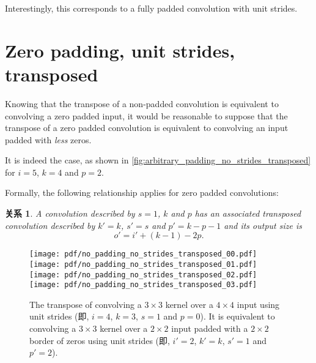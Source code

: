 \documentclass[notitlepage]{ctexrep}
\newtheorem{relationship}{关系}
\begin{document}
Interestingly, this corresponds to a fully padded convolution with unit
strides.

\section{Zero padding, unit strides, transposed}

Knowing that the transpose of a non-padded convolution is equivalent to
convolving a zero padded input, it would be reasonable to suppose that the
transpose of a zero padded convolution is equivalent to convolving an input
padded with {\em less\/} zeros.

It is indeed the case, as shown in
\autoref{fig:arbitrary_padding_no_strides_transposed} for $i = 5$, $k = 4$ and
$p = 2$.

Formally, the following relationship applies for zero padded convolutions:

\begin{relationship}\label{rel:arbitrary_padding_no_strides_transposed}
A convolution described by $s = 1$, $k$ and $p$ has an
associated transposed convolution described by $k' = k$, $s' = s$ and $p' = k -
p - 1$ and its output size is
\begin{equation*}
    o' = i' + (k - 1) - 2p.
\end{equation*}
\end{relationship}

\begin{figure}[p]
    \centering
    \texttt{[image: pdf/no\_padding\_no\_strides\_transposed\_00.pdf]}
    \texttt{[image: pdf/no\_padding\_no\_strides\_transposed\_01.pdf]}
    \texttt{[image: pdf/no\_padding\_no\_strides\_transposed\_02.pdf]}
    \texttt{[image: pdf/no\_padding\_no\_strides\_transposed\_03.pdf]}
    \caption{\label{fig:no_padding_no_strides_transposed} The transpose of
        convolving a $3 \times 3$ kernel over a $4 \times 4$ input using unit
        strides (即, $i = 4$, $k = 3$, $s = 1$ and $p = 0$). It is equivalent
        to convolving a $3 \times 3$ kernel over a $2 \times 2$ input padded
        with a $2 \times 2$ border of zeros using unit strides (即, $i' = 2$,
        $k' = k$, $s' = 1$ and $p' = 2$).}
\end{figure}
\end{document}
